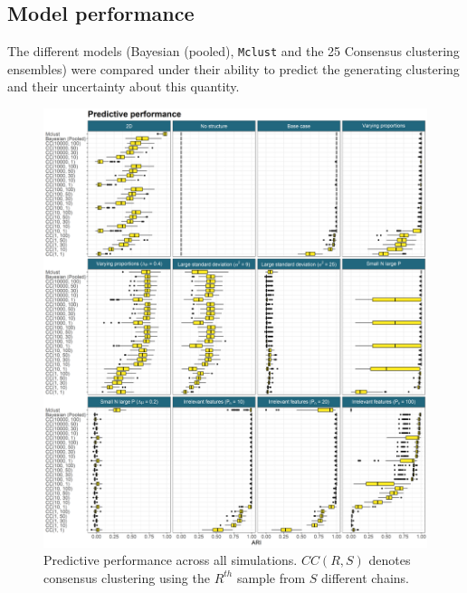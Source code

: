 \documentclass[]{article}
\begin{document}

\subsection{Model performance}
The different models (Bayesian (pooled), \texttt{Mclust} and the 25 Consensus clustering ensembles) were compared under their ability to predict the generating clustering and their uncertainty about this quantity.

\begin{figure} %
	\centering
	\includegraphics[scale=0.5]{./Images/Simulations/simulation_model_prediction.png}
	\caption{Predictive performance across all simulations. $CC(R, S)$ denotes consensus clustering using the $R^{th}$ sample from $S$ different chains.}
	\label{fig:simPrediction}
\end{figure}
\end{document}
